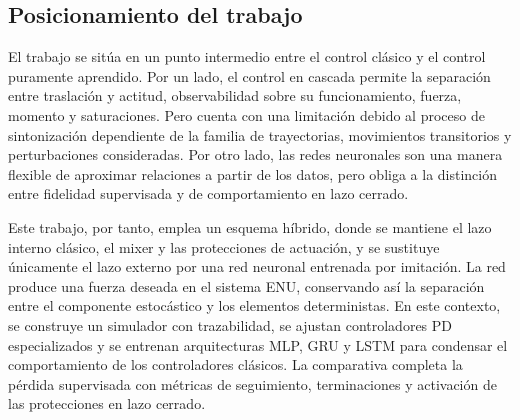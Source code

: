 \subsection{Posicionamiento del trabajo}

El trabajo se sitúa en un punto intermedio entre el control clásico y el control 
puramente aprendido. Por un lado, el control en cascada permite la separación
entre traslación y actitud, observabilidad sobre su funcionamiento, fuerza, 
momento y saturaciones. Pero cuenta con una limitación debido al proceso de sintonización dependiente de la familia de trayectorias, movimientos
transitorios y perturbaciones consideradas. Por otro lado, las redes neuronales
son una manera flexible de aproximar relaciones a partir de los datos, pero obliga
a la distinción entre fidelidad supervisada y de comportamiento en lazo cerrado.

Este trabajo, por tanto, emplea un esquema híbrido, donde se mantiene el lazo interno
clásico, el mixer y las protecciones de actuación, y se sustituye únicamente el lazo
externo por una red neuronal entrenada por imitación. La red produce una fuerza deseada
en el sistema ENU, conservando así la separación entre el componente estocástico y los
elementos deterministas. 
En este contexto, se construye un simulador con trazabilidad, se ajustan controladores
PD especializados y se entrenan arquitecturas MLP, GRU y LSTM para condensar el comportamiento
de los controladores clásicos. La comparativa completa la pérdida supervisada con métricas
de seguimiento, terminaciones y activación de las protecciones en lazo cerrado.
